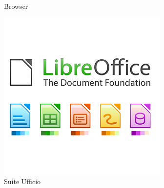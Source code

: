 \documentclass{beamer}
\begin{document}
\begin{frame}
\begin{minipage}[b][.35\textheight][t]{.3\textwidth}
    \centering
    Browser
    \end{minipage}\hfill
    \begin{minipage}[b][.35\textheight][t]{.3\textwidth}
    \includegraphics[width=.7\textwidth]{img/libreoffice.png}\\
    \centering
    Suite Ufficio
    \end{minipage}\\[0.5em]


\end{frame}
\end{document}
